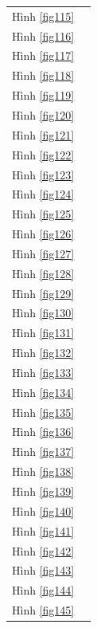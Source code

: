 \documentclass[12pt,a4paper]{report}
\numberwithin{equation}{section}
\theoremstyle{definition} %
\begin{document}
\begin{longtable}{l   l }
Hình \ref{fig115} & \pageref{fig115} \\
Hình \ref{fig116} & \pageref{fig116} \\
Hình \ref{fig117} & \pageref{fig117} \\
Hình \ref{fig118} & \pageref{fig118} \\
Hình \ref{fig119} & \pageref{fig119} \\
Hình \ref{fig120} & \pageref{fig120} \\
Hình \ref{fig121} & \pageref{fig121} \\
Hình \ref{fig122} & \pageref{fig122} \\
Hình \ref{fig123} & \pageref{fig123} \\
Hình \ref{fig124} & \pageref{fig124} \\
Hình \ref{fig125} & \pageref{fig125} \\
Hình \ref{fig126} & \pageref{fig126} \\
Hình \ref{fig127} & \pageref{fig127} \\
Hình \ref{fig128} & \pageref{fig128} \\
Hình \ref{fig129} & \pageref{fig129} \\
Hình \ref{fig130} & \pageref{fig130} \\
Hình \ref{fig131} & \pageref{fig131} \\
Hình \ref{fig132} & \pageref{fig132} \\
Hình \ref{fig133} & \pageref{fig133} \\
Hình \ref{fig134} & \pageref{fig134} \\
Hình \ref{fig135} & \pageref{fig135} \\
Hình \ref{fig136} & \pageref{fig136} \\
Hình \ref{fig137} & \pageref{fig137} \\
Hình \ref{fig138} & \pageref{fig138} \\
Hình \ref{fig139} & \pageref{fig139} \\
Hình \ref{fig140} & \pageref{fig140} \\
Hình \ref{fig141} & \pageref{fig141} \\
Hình \ref{fig142} & \pageref{fig142} \\
Hình \ref{fig143} & \pageref{fig143} \\
Hình \ref{fig144} & \pageref{fig144} \\
Hình \ref{fig145} & \pageref{fig145} \\
\end{longtable}


	\newpage
\end{document}
